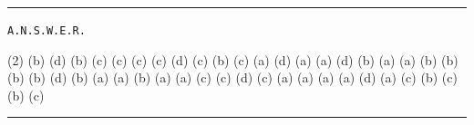 \documentclass{article}
\begin{document}
\hrule

\pagebreak

\begin{center}
\texttt{A.N.S.W.E.R.}
\end{center}


\begin{tasks}[label=\arabic*.](2)
	\task (b)
	\task (d)
	\task (b)
	\task (c)
	\task (c)
	\task (c)
	\task (c)
	\task (d)
	\task (c)
	\task (b)
	\task (c)
	\task (a)
	\task (d)
	\task (a)
	\task (a)
	\task (d)
	\task (b)
	\task (a)
	\task (a)
	\task (b)
	\task (b)
	\task (b)
	\task (b)
	\task (d)
	\task (b)
	\task (a)
	\task (a)
	\task (b)
	\task (a)
	\task (a)
	\task (c)
	\task (c)
	\task (d)
	\task (c)
	\task (a)
	\task (a)
	\task (a)
	\task (a)
	\task (d)
	\task (a)
	\task (c)
	\task (b)
	\task (c)
	\task (b)
	\task (c)
\end{tasks}
\hrule
\end{document}
